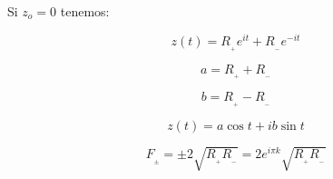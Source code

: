 \documentclass[preview]{standalone}
\begin{document}
\begin{center}
Si $z_o=0$ tenemos:

$$z(t)=R_{_+} e^{it} +R_{_-} e^{-it}$$

$$a=R_{_+}+R_{_-}$$ 

$$b=R_{_+}-R_{_-}$$

$$z(t)=a\cos{t}+i b \sin{t}$$ 

$$F_{_{\pm}}=\pm 2\sqrt{R_{_+}R_{_-}}=2 e^{i\pi k} \sqrt{R_{_+}R_{_-}}$$
\end{center}
\end{document}
